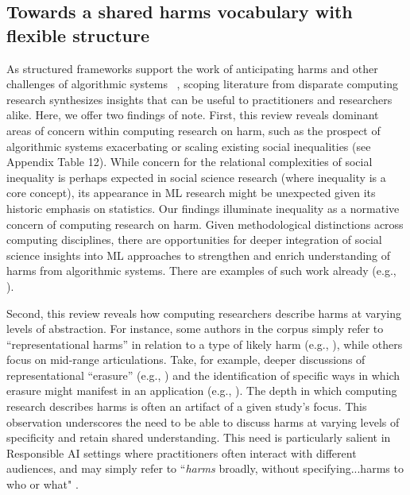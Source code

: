 \subsection{Towards a shared harms vocabulary with flexible structure} 
As structured frameworks support the work of anticipating harms and other challenges of algorithmic systems ~\cite{Madaio_2020, Wong_Boyd_Metcalf_Shilton_2020}, scoping literature from disparate computing research synthesizes insights that can be useful to practitioners and researchers alike. Here, we offer two findings of note. First, this review reveals dominant areas of concern within computing research on harm, such as the prospect of algorithmic systems exacerbating or scaling existing social inequalities (see Appendix Table 12). While concern for the relational complexities of social inequality is perhaps expected in social science research (where inequality is a core concept), its appearance in ML research might be unexpected given its historic emphasis on statistics. Our findings illuminate inequality as a normative concern of computing research on harm. Given methodological distinctions across computing disciplines, there are opportunities for deeper integration of social science insights into ML approaches to strengthen and enrich understanding of harms from algorithmic systems. There are examples of such work already (e.g., \cite{lee2022, bhatt-etal-2022-contextualizing}).

Second, this review reveals how computing researchers describe harms at varying levels of abstraction. For instance, some authors in the corpus simply refer to “representational harms” in relation to a type of likely harm (e.g., \cite{Davis_Williams_Yang_2021}), while others focus on mid-range articulations. Take, for example, deeper discussions of representational “erasure” (e.g., \cite{Katzman_Barocas_Blodgett_Laird_Scheuerman_Wallach_2021}) and the identification of specific ways in which erasure might manifest in an application (e.g., \cite{Andalibi_Garcia_2021, Dev_Monajatipoor_Ovalle_Subramonian_Phillips_Chang_2021}). The depth in which computing research describes harms is often an artifact of a given study's focus. This observation underscores the need to be able to discuss harms at varying levels of specificity and retain shared understanding. This need is particularly salient in Responsible AI settings where practitioners often interact with different audiences, and may simply refer to ``\textit{harms} broadly, without specifying...harms to who or what" \cite[p. 9]{rismani2022plane}. 

